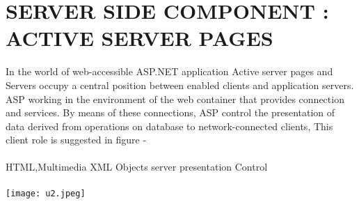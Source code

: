 \documentclass{article}
\begin{document}
\section*{SERVER SIDE COMPONENT : ACTIVE SERVER PAGES}
In the world of web-accessible ASP.NET application Active server pages and Servers occupy a central position between enabled clients and application servers. ASP working in the environment of the web container that provides connection and services. By means of these connections, ASP control the presentation of data derived from operations on database to network-connected clients, This client role is suggested in figure - 
\\
\\
HTML,Multimedia XML Objects server presentation Control
\\
\\
\texttt{[image: u2.jpeg]}
\end{document}
